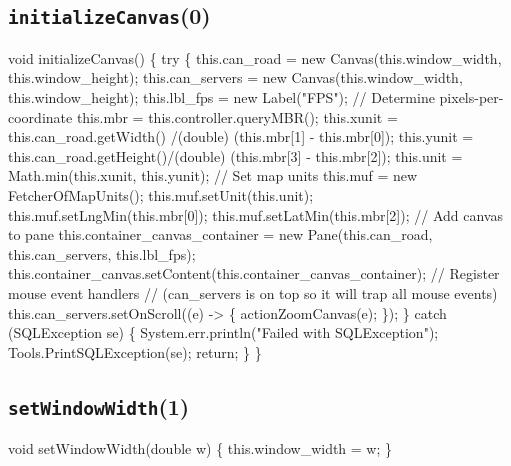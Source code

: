 \subsection{\texttt{initializeCanvas}(0)}
\nwenddocs{}\endmoddef{}
void initializeCanvas() \{
  try \{
    this.can_road    = new Canvas(this.window_width, this.window_height);
    this.can_servers = new Canvas(this.window_width, this.window_height);
    this.lbl_fps     = new Label("FPS");
    // Determine pixels-per-coordinate
    this.mbr   = this.controller.queryMBR();
    this.xunit = this.can_road.getWidth() /(double) (this.mbr[1] - this.mbr[0]);
    this.yunit = this.can_road.getHeight()/(double) (this.mbr[3] - this.mbr[2]);
    this.unit  = Math.min(this.xunit, this.yunit);
    // Set map units
    this.muf = new FetcherOfMapUnits();
    this.muf.setUnit(this.unit);
    this.muf.setLngMin(this.mbr[0]);
    this.muf.setLatMin(this.mbr[2]);
    // Add canvas to pane
    this.container_canvas_container = new Pane(this.can_road, this.can_servers, this.lbl_fps);
    this.container_canvas.setContent(this.container_canvas_container);
    // Register mouse event handlers
    // (can_servers is on top so it will trap all mouse events)
    this.can_servers.setOnScroll((e) -> \{ actionZoomCanvas(e); \});
  \} catch (SQLException se) \{
    System.err.println("Failed with SQLException");
    Tools.PrintSQLException(se);
    return;
  \}
\}
\eatline
{}\nwendcode{}\nwdocspar
\subsection{\texttt{setWindowWidth}(1)}
\nwenddocs{}\endmoddef{}
void setWindowWidth(double w) \{
  this.window_width = w;
\}
\eatline
{}\nwendcode{}\nwdocspar
